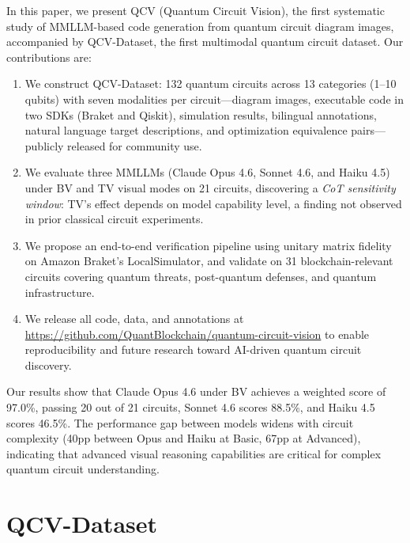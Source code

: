 \documentclass[conference]{IEEEtran}
\begin{document}
In this paper, we present QCV (Quantum Circuit Vision), the first systematic study of MMLLM-based code generation from quantum circuit diagram images, accompanied by QCV-Dataset, the first multimodal quantum circuit dataset. Our contributions are:
\begin{enumerate}
    \item We construct QCV-Dataset: 132 quantum circuits across 13 categories (1--10 qubits) with seven modalities per circuit---diagram images, executable code in two SDKs (Braket and Qiskit), simulation results, bilingual annotations, natural language target descriptions, and optimization equivalence pairs---publicly released for community use.
    \item We evaluate three MMLLMs (Claude Opus 4.6, Sonnet 4.6, and Haiku 4.5) under BV and TV visual modes on 21 circuits, discovering a \emph{CoT sensitivity window}: TV's effect depends on model capability level, a finding not observed in prior classical circuit experiments.
    \item We propose an end-to-end verification pipeline using unitary matrix fidelity on Amazon Braket's LocalSimulator, and validate on 31 blockchain-relevant circuits covering quantum threats, post-quantum defenses, and quantum infrastructure.
    \item We release all code, data, and annotations at \url{https://github.com/QuantBlockchain/quantum-circuit-vision} to enable reproducibility and future research toward AI-driven quantum circuit discovery.
\end{enumerate}

Our results show that Claude Opus 4.6 under BV achieves a weighted score of 97.0\%, passing 20 out of 21 circuits, Sonnet 4.6 scores 88.5\%, and Haiku 4.5 scores 46.5\%. The performance gap between models widens with circuit complexity (40pp between Opus and Haiku at Basic, 67pp at Advanced), indicating that advanced visual reasoning capabilities are critical for complex quantum circuit understanding.

\section{QCV-Dataset}
\end{document}
